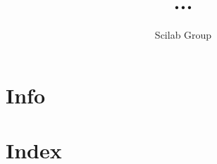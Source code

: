 \documentclass[11pt]{book}
\title{...}
\author{Scilab Group}
\begin{document}
\maketitle

\tableofcontents 

\chapter{Info}

 
 

\chapter{Index}

\printindex
\end{document}
